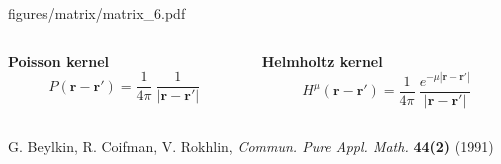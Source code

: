 \begin{frame}
\begin{columns}
\begin{column}[b]{0.5\linewidth}
\begin{center}
{    {figures/matrix/matrix_6.pdf}
    }
    \vspace{5mm}
    \end{center}
    \end{column}
    \end{columns}
    \vspace{5mm}
    \begin{columns}
    \begin{column}{.48\textwidth}
    \centering
    \textbf{Poisson kernel}
    \begin{equation}
	\nonumber
	P(\boldsymbol{r}-\boldsymbol{r}') = 
	    \frac{1}{4\pi}\ \frac{1}{|\boldsymbol{r}-\boldsymbol{r}'|}
    \end{equation}
    \end{column}
    \begin{column}{.48\textwidth}
    \centering
    \textbf{Helmholtz kernel}
    \begin{equation}
	\nonumber
	H^{\mu}(\boldsymbol{r}-\boldsymbol{r}') = \frac{1}{4\pi}\ 
	\frac{e^{-\mu |\boldsymbol{r}-\boldsymbol{r}'|}}
        {|\boldsymbol{r}-\boldsymbol{r}'|}
    \end{equation}
    \end{column}
    \end{columns}    
    \centering
    \vspace{8mm}
    \tiny
    G. Beylkin, R. Coifman, V. Rokhlin, 
    {\it Commun. Pure Appl. Math.}
    \textbf{44(2)}
    (1991)
\end{frame}

